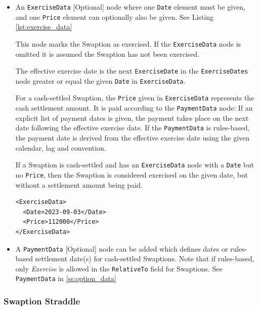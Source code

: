 \begin{itemize}
Allowable values:  See section \ref{ss:premiums}

\item An \lstinline!ExerciseData! [Optional] node where one  \lstinline!Date! element must be given, and one \lstinline!Price! element can optionally also be given.  See Listing \ref{lst:exercise_data}

This node marks the Swaption as exercised. If the \lstinline!ExerciseData! node is omitted it is assumed the Swaption has not been exercised. 

The effective exercise date is the next \lstinline!ExerciseDate! in the \lstinline!ExerciseDates! node
  greater or equal the given \lstinline!Date!  in \lstinline!ExerciseData!. 
  
  For a cash-settled Swaption, the \lstinline!Price! given in \lstinline!ExerciseData!
  represents the cash settlement amount. It is paid according to the \lstinline!PaymentData! node: If an explicit list of payment dates is given, the payment takes place on the next date following the effective exercise date. If the \lstinline!PaymentData! is rules-based, the payment date is derived from the effective exercise date using the given calendar, lag and convention.
  
If a Swaption is cash-settled and has an \lstinline!ExerciseData! node with a \lstinline!Date!  but no \lstinline!Price!, then the Swaption is considered exercised on the given date, but without a settlement amount being paid.   
  
 \begin{listing}[H]
\begin{verbatim}
<ExerciseData>
  <Date>2023-09-03</Date>
  <Price>112000</Price>
</ExerciseData>
\end{verbatim}
\caption{ExerciseData to mark a Swaption or CallableSwap as exercised}
\label{lst:exercise_data}
\end{listing}
  
\item A \lstinline!PaymentData! [Optional] node can be added which defines dates or rules-based settlement date(s) for cash-settled Swaptions.  Note that if rules-based, only \emph{Exercise} is allowed in the \lstinline!RelativeTo! field for Swaptions. See  \lstinline!PaymentData! in \ref{ss:option_data}


\end{itemize}

\subsubsection{Swaption Straddle}
\label{ss:swaption_straddle}

